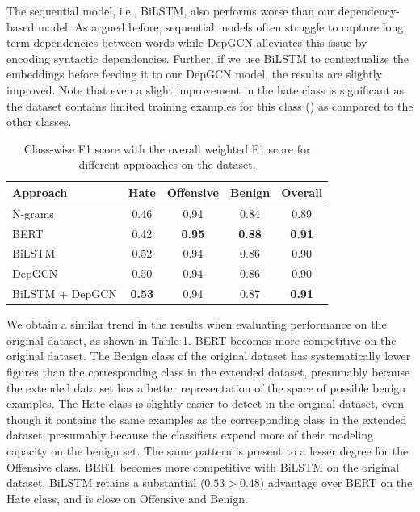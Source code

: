 The sequential model, i.e., BiLSTM, also performs worse than our dependency-based model. As argued before, sequential models often struggle to capture long term dependencies between words while DepGCN alleviates this issue by encoding syntactic dependencies. Further, if we use BiLSTM to contextualize the embeddings before feeding it to our DepGCN model, the results are slightly improved. Note that even a slight improvement in the hate class is significant as the dataset contains limited training examples for this class () as compared to the other classes.

\begin{table}[tbh]
  \centering
  \small
  \setlength{\tabcolsep}{2pt}
\begin{tabular}{ l | c c  c c}
\toprule %
 Approach &  Hate & Offensive & Benign & Overall \\ %
  \midrule
 N-grams & 0.46 & 0.94 & 0.84 & 0.89 \\
 BERT & 0.42 & \textbf{0.95} & \textbf{0.88} & \textbf{0.91} \\
BiLSTM & 0.52 & 0.94 & 0.86 & 0.90 \\
DepGCN & 0.50 & 0.94 & 0.86 & 0.90 \\
BiLSTM + DepGCN & \textbf{0.53} & 0.94 & 0.87 & \textbf{0.91} \\
 \bottomrule %
\end{tabular}
\caption{\label{tab:davidson} Class-wise F1 score with the overall weighted F1 score for different approaches on the \citet{davidson2017automated} dataset.}
\end{table}

We obtain a similar trend in the results when evaluating performance on the original \citet{davidson2017automated} dataset, as shown in Table \ref{tab:davidson}. BERT becomes more competitive on the original dataset. The Benign class of the original dataset has systematically lower figures than the corresponding class in the extended dataset, presumably because the extended data set has a better representation of the space of possible benign examples. The Hate class is slightly easier to detect in the original dataset, even though it contains the same examples as the corresponding class in the extended dataset, presumably because the classifiers expend more of their modeling capacity on the benign set. The same pattern is present to a lesser degree for the Offensive class.
BERT becomes more competitive with BiLSTM on the original dataset. BiLSTM retains a substantial ($0.53 > 0.48$) advantage over BERT on the Hate class, and is close on Offensive and Benign.

